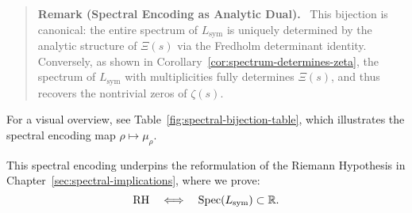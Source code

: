 \begin{quote}
  \textbf{Remark (Spectral Encoding as Analytic Dual).}~
  This bijection is canonical: the entire spectrum of \( L_{\mathrm{sym}} \) is uniquely determined by the analytic structure of \( \Xi(s) \) via the Fredholm determinant identity. Conversely, as shown in Corollary~\ref{cor:spectrum-determines-zeta}, the spectrum of \( L_{\mathrm{sym}} \) with multiplicities fully determines \( \Xi(s) \), and thus recovers the nontrivial zeros of \( \zeta(s) \).
\end{quote}

For a visual overview, see Table~\ref{fig:spectral-bijection-table}, which illustrates the spectral encoding map \( \rho \mapsto \mu_\rho \).

\medskip
\noindent
This spectral encoding underpins the reformulation of the Riemann Hypothesis in Chapter~\ref{sec:spectral-implications}, where we prove:
\[
\mathrm{RH} \quad \Longleftrightarrow \quad \operatorname{Spec}(L_{\mathrm{sym}}) \subset \mathbb{R}.
\]
% 